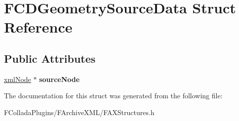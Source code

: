 \hypertarget{structFCDGeometrySourceData}{
\section{FCDGeometrySourceData Struct Reference}
\label{structFCDGeometrySourceData}
}
\subsection*{Public Attributes}
\begin{DoxyCompactItemize}
\item 
\hypertarget{structFCDGeometrySourceData_a20c09f6277b3f13cc2eece3e8dd01223}{
\hyperlink{struct__xmlNode}{xmlNode} $\ast$ {\bfseries sourceNode}}
\label{structFCDGeometrySourceData_a20c09f6277b3f13cc2eece3e8dd01223}

\end{DoxyCompactItemize}


The documentation for this struct was generated from the following file:\begin{DoxyCompactItemize}
\item 
FColladaPlugins/FArchiveXML/FAXStructures.h\end{DoxyCompactItemize}
